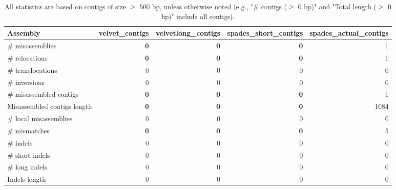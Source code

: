 \documentclass[12pt,a4paper]{article}
\begin{document}
\begin{table}[ht]
\begin{center}
\caption{All statistics are based on contigs of size $\geq$ 500 bp, unless otherwise noted (e.g., "\# contigs ($\geq$ 0 bp)" and "Total length ($\geq$ 0 bp)" include all contigs).}
\begin{tabular}{|l*{4}{|r}|}
\hline
Assembly & velvet\_contigs & velvetlong\_contigs & spades\_short\_contigs & spades\_actual\_contigs \\ \hline
\# misassemblies & {\bf 0} & {\bf 0} & {\bf 0} & 1 \\ \hline
\hspace{5mm}\# relocations & {\bf 0} & {\bf 0} & {\bf 0} & 1 \\ \hline
\hspace{5mm}\# translocations & 0 & 0 & 0 & 0 \\ \hline
\hspace{5mm}\# inversions & 0 & 0 & 0 & 0 \\ \hline
\# misassembled contigs & {\bf 0} & {\bf 0} & {\bf 0} & 1 \\ \hline
Misassembled contigs length & {\bf 0} & {\bf 0} & {\bf 0} & 1084 \\ \hline
\# local misassemblies & 0 & 0 & 0 & 0 \\ \hline
\# mismatches & {\bf 0} & {\bf 0} & {\bf 0} & 5 \\ \hline
\# indels & 0 & 0 & 0 & 0 \\ \hline
\hspace{5mm}\# short indels & 0 & 0 & 0 & 0 \\ \hline
\hspace{5mm}\# long indels & 0 & 0 & 0 & 0 \\ \hline
Indels length & 0 & 0 & 0 & 0 \\ \hline
\end{tabular}
\end{center}
\end{table}
\end{document}
